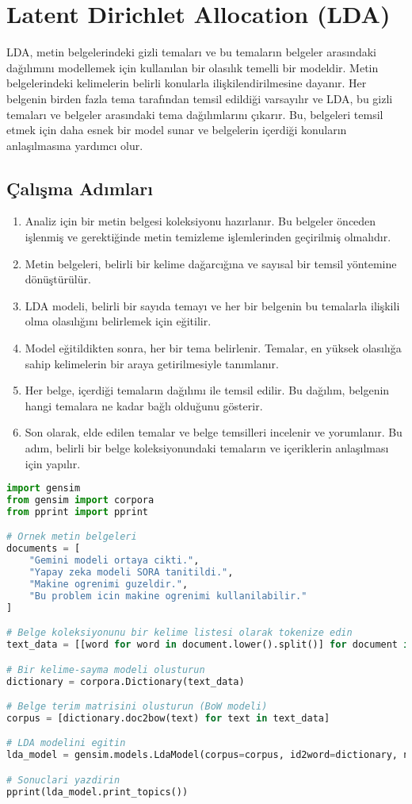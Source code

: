 \section{Latent Dirichlet Allocation (LDA)}
LDA, metin belgelerindeki gizli temaları ve bu temaların belgeler arasındaki dağılımını modellemek için kullanılan bir olasılık temelli bir modeldir.  Metin belgelerindeki kelimelerin belirli konularla ilişkilendirilmesine dayanır. Her belgenin birden fazla tema tarafından temsil edildiği varsayılır ve LDA, bu gizli temaları ve belgeler arasındaki tema dağılımlarını çıkarır. Bu, belgeleri temsil etmek için daha esnek bir model sunar ve belgelerin içerdiği konuların anlaşılmasına yardımcı olur.

\subsection{Çalışma Adımları}
\begin{enumerate}
    \item Analiz için bir metin belgesi koleksiyonu hazırlanır. Bu belgeler önceden işlenmiş ve gerektiğinde metin temizleme işlemlerinden geçirilmiş olmalıdır.
    \item Metin belgeleri, belirli bir kelime dağarcığına ve sayısal bir temsil yöntemine dönüştürülür.
    \item LDA modeli, belirli bir sayıda temayı ve her bir belgenin bu temalarla ilişkili olma olasılığını belirlemek için eğitilir. 
    \item Model eğitildikten sonra, her bir tema belirlenir. Temalar, en yüksek olasılığa sahip kelimelerin bir araya getirilmesiyle tanımlanır.
    \item Her belge, içerdiği temaların dağılımı ile temsil edilir. Bu dağılım, belgenin hangi temalara ne kadar bağlı olduğunu gösterir.
    \item Son olarak, elde edilen temalar ve belge temsilleri incelenir ve yorumlanır. Bu adım, belirli bir belge koleksiyonundaki temaların ve içeriklerin anlaşılması için yapılır.
\end{enumerate}

\begin{lstlisting}[language=Python]
import gensim
from gensim import corpora
from pprint import pprint

# Ornek metin belgeleri
documents = [
    "Gemini modeli ortaya cikti.",
    "Yapay zeka modeli SORA tanitildi.",
    "Makine ogrenimi guzeldir.",
    "Bu problem icin makine ogrenimi kullanilabilir."
]

# Belge koleksiyonunu bir kelime listesi olarak tokenize edin
text_data = [[word for word in document.lower().split()] for document in documents]

# Bir kelime-sayma modeli olusturun
dictionary = corpora.Dictionary(text_data)

# Belge terim matrisini olusturun (BoW modeli)
corpus = [dictionary.doc2bow(text) for text in text_data]

# LDA modelini egitin
lda_model = gensim.models.LdaModel(corpus=corpus, id2word=dictionary, num_topics=2, passes=10)

# Sonuclari yazdirin
pprint(lda_model.print_topics())
\end{lstlisting}

\newpage
